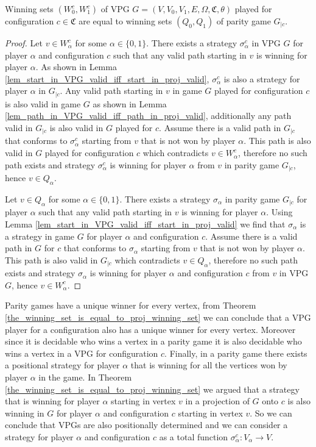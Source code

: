 \begin{theorem}
	\label{the_winning_set_is_equal_to_proj_winning_set}
	Winning sets $(W_0^c, W_1^c)$ of VPG $G = (V,V_0,V_1,E,\Omega,\mathfrak{C},\theta)$ played for configuration $c \in \mathfrak{C}$ are equal to winning sets $(Q_0,Q_1)$ of parity game $G_{|c}$.
	\begin{proof}
		Let $v \in W_\alpha^c$ for some $\alpha \in \{0,1\}$. There exists a strategy $\sigma_\alpha^c$ in VPG $G$ for player $\alpha$ and configuration $c$ such that any valid path starting in $v$ is winning for player $\alpha$. As shown in Lemma \ref{lem_start_in_VPG_valid_iff_start_in_proj_valid}, $\sigma_\alpha^c$ is also a strategy for player $\alpha$ in $G_{|c}$. Any valid path starting in $v$ in game $G$ played for configuration $c$ is also valid in game $G$ as shown in Lemma \ref{lem_path_in_VPG_valid_iff_path_in_proj_valid}, additionally any path valid in $G_{|c}$ is also valid in $G$ played for $c$. Assume there is a valid path in $G_{|c}$ that conforms to $\sigma_\alpha^c$ starting from $v$ that is not won by player $\alpha$. This path is also valid in $G$ played for configuration $c$ which contradicts $v \in W_\alpha^c$, therefore no such path exists and strategy $\sigma_\alpha^c$ is winning for player $\alpha$ from $v$ in parity game $G_{|c}$, hence $v \in Q_\alpha$.
		
		Let $v \in Q_\alpha$ for some $\alpha \in \{0,1\}$. There exists a strategy $\sigma_\alpha$ in parity game $G_{|c}$ for player $\alpha$ such that any valid path starting in $v$ is winning for player $\alpha$. Using Lemma \ref{lem_start_in_VPG_valid_iff_start_in_proj_valid} we find that $\sigma_\alpha$ is a strategy in game $G$ for player $\alpha$ and configuration $c$. Assume there is a valid path in $G$ for $c$ that conforms to $\sigma_\alpha$ starting from $v$ that is not won by player $\alpha$. This path is also valid in $G_{|c}$ which contradicts $v \in Q_\alpha$, therefore no such path exists and strategy $\sigma_\alpha$ is winning for player $\alpha$ and configuration $c$ from $v$ in VPG $G$, hence $v \in W_\alpha^c$.
	\end{proof}
\end{theorem}

Parity games have a unique winner for every vertex, from Theorem \ref{the_winning_set_is_equal_to_proj_winning_set} we can conclude that a VPG player for a configuration also has a unique winner for every vertex. Moreover since it is decidable who wins a vertex in a parity game it is also decidable who wins a vertex in a VPG for configuration $c$. Finally, in a parity game there exists a positional strategy for player $\alpha$ that is winning for all the vertices won by player $\alpha$ in the game. In Theorem \ref{the_winning_set_is_equal_to_proj_winning_set} we argued that a strategy that is winning for player $\alpha$ starting in vertex $v$ in a projection of $G$ onto $c$ is also winning in $G$ for player $\alpha$ and configuration $c$ starting in vertex $v$. So we can conclude that VPGs are also positionally determined and we can consider a strategy for player $\alpha$ and configuration $c$ as a total function $\sigma_\alpha^c : V_\alpha \rightarrow V$.

